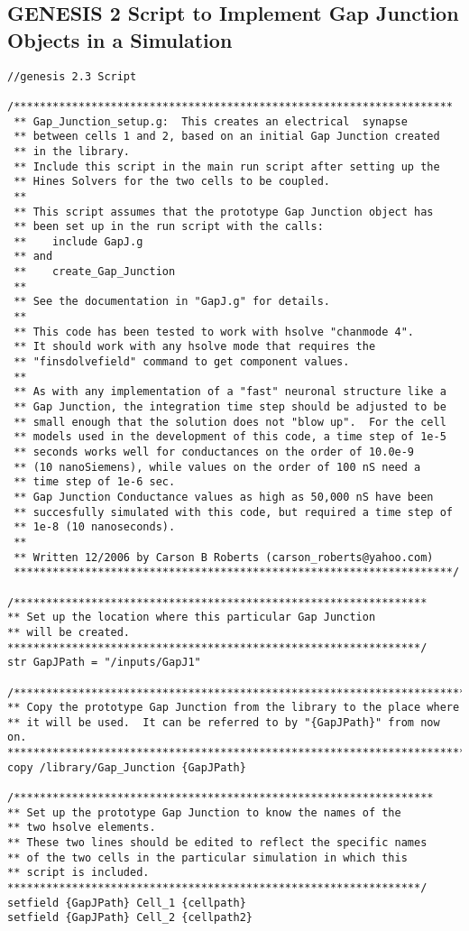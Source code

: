 \documentclass[12pt]{article}
\begin{document}
\subsection*{GENESIS 2 Script to Implement Gap Junction Objects in a Simulation}
\begin{verbatim}
//genesis 2.3 Script

/********************************************************************
 ** Gap_Junction_setup.g:  This creates an electrical  synapse
 ** between cells 1 and 2, based on an initial Gap Junction created
 ** in the library.
 ** Include this script in the main run script after setting up the
 ** Hines Solvers for the two cells to be coupled.
 **
 ** This script assumes that the prototype Gap Junction object has
 ** been set up in the run script with the calls:
 **    include GapJ.g
 ** and
 **    create_Gap_Junction
 **
 ** See the documentation in "GapJ.g" for details.
 **
 ** This code has been tested to work with hsolve "chanmode 4".
 ** It should work with any hsolve mode that requires the
 ** "finsdolvefield" command to get component values.
 **
 ** As with any implementation of a "fast" neuronal structure like a
 ** Gap Junction, the integration time step should be adjusted to be
 ** small enough that the solution does not "blow up".  For the cell
 ** models used in the development of this code, a time step of 1e-5
 ** seconds works well for conductances on the order of 10.0e-9
 ** (10 nanoSiemens), while values on the order of 100 nS need a
 ** time step of 1e-6 sec.
 ** Gap Junction Conductance values as high as 50,000 nS have been
 ** succesfully simulated with this code, but required a time step of
 ** 1e-8 (10 nanoseconds).
 **
 ** Written 12/2006 by Carson B Roberts (carson_roberts@yahoo.com)
 ********************************************************************/
 
/****************************************************************
** Set up the location where this particular Gap Junction
** will be created.
****************************************************************/
str GapJPath = "/inputs/GapJ1"

/************************************************************************
** Copy the prototype Gap Junction from the library to the place where
** it will be used.  It can be referred to by "{GapJPath}" from now on.
*************************************************************************/
copy /library/Gap_Junction {GapJPath}

/*****************************************************************
** Set up the prototype Gap Junction to know the names of the
** two hsolve elements.
** These two lines should be edited to reflect the specific names
** of the two cells in the particular simulation in which this
** script is included.
****************************************************************/
setfield {GapJPath} Cell_1 {cellpath}
setfield {GapJPath} Cell_2 {cellpath2}


\end{verbatim}
\end{document}
